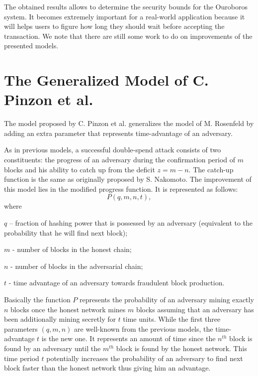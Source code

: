 \documentclass[10pt,a4paper]{article}
\numberwithin{equation}{section} %
\theoremstyle{plain}
\theoremstyle{definition}
\theoremstyle{remark}
\begin{document}
	The obtained results allows to determine the security bounds for the Ouroboros system. It becomes extremely important for a real-world application because it will helps users to figure how long they should wait before accepting the transaction. We note that there are still some work to do on improvements of the presented models.
	
	
    \printbibliography
    
    \appendix
    
    \section{The Generalized Model of C. Pinzon et al.} \label{sec:generalized-model}
	
	The model proposed by C. Pinzon et al. \cite{PR16} generalizes the model of M. Rosenfeld by adding an extra parameter that represents time-advantage of an adversary.
	
	As in previous models, a successful double-spend attack consists of two constituents: the progress of an adversary during the confirmation period of \(m\) blocks and his ability to catch up from the deficit \(z = m - n\). The catch-up function is the same as originally proposed by S. Nakomoto. The improvement of this model lies in the modified progress function. It is represented as follows: \[P(q,m,n,t),\] where
	
	\(q\) -- fraction of hashing power that is possessed by an adversary (equivalent to the probability that he will find next block);
	
	\(m\) - number of blocks in the honest chain;
	
	\(n\) - number of blocks in the adversarial chain;
	
	\(t\) - time advantage of an adversary towards fraudulent block production.
	
	Basically the function \(P\) represents the probability of an adversary mining exactly \(n\) blocks once the honest network mines \(m\) blocks assuming that an adversary has been additionally mining secretly for \(t\) time units. While the first three parameters \((q,m,n)\) are well-known from the previous models, the time-advantage \(t\) is the new one. It represents an amount of time since the \(n^{th}\) block is found by an adversary until the \(m^{th}\) block is found by the honest network. This time period \(t\) potentially increases the probability of an adversary to find next block faster than the honest network thus giving him an advantage.
	
\end{document}
